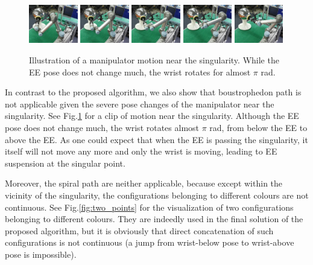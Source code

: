 \documentclass[Afour,sageh,times]{sagej}
\begin{document}
\begin{figure}[t]
\centering
\includegraphics[width = 0.19\textwidth]{figures/real_world/show_huge_change/pose_1}
\includegraphics[width = 0.19\textwidth]{figures/real_world/show_huge_change/pose_2}
\includegraphics[width = 0.19\textwidth]{figures/real_world/show_huge_change/pose_3}
\includegraphics[width = 0.19\textwidth]{figures/real_world/show_huge_change/pose_4}
\includegraphics[width = 0.19\textwidth]{figures/real_world/show_huge_change/pose_5}
\caption{Illustration of a manipulator motion near the singularity. While the EE pose does not change much, the wrist rotates for almost $\pi$ rad. }\label{fig:boust}
\end{figure}

In contrast to the proposed algorithm, we also show that boustrophedon path is not applicable given the severe pose changes of the manipulator near the singularity. See Fig.\ref{fig:boust} for a clip of motion near the singularity. Although the EE pose does not change much, the wrist rotates almost $\pi$ rad, from below the EE to above the EE. As one could expect that when the EE is passing the singularity, it itself will not move any more and only the wrist is moving, leading to EE suspension at the singular point. 

Moreover, the spiral path are neither applicable, because except within the vicinity of the singularity, the configurations belonging to different colours are not continuous. See Fig.\ref{fig:two_points} for the visualization of two configurations belonging to different colours. They are indeedly used in the final solution of the proposed algorithm, but it is obviously that direct concatenation of such configurations is not continuous (a jump from wrist-below pose to wrist-above pose is impossible). 
\end{document}
